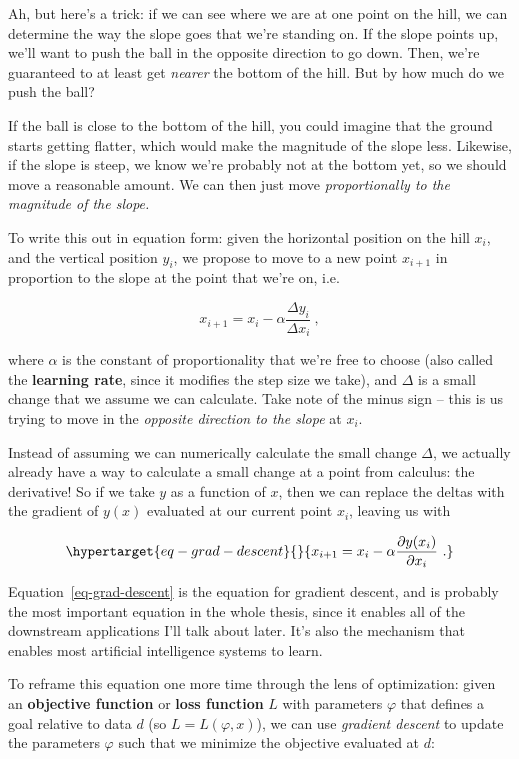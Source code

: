 \documentclass[
  11pt,
  numbers=noendperiod]{book}
\begin{document}
Ah, but here's a trick: if we can see where we are at one point on the
hill, we can determine the way the slope goes that we're standing on. If
the slope points up, we'll want to push the ball in the opposite
direction to go down. Then, we're guaranteed to at least get
\emph{nearer} the bottom of the hill. But by how much do we push the
ball?

If the ball is close to the bottom of the hill, you could imagine that
the ground starts getting flatter, which would make the magnitude of the
slope less. Likewise, if the slope is steep, we know we're probably not
at the bottom yet, so we should move a reasonable amount. We can then
just move \emph{proportionally to the magnitude of the slope.}

To write this out in equation form: given the horizontal position on the
hill \(x_i\), and the vertical position \(y_i\), we propose to move to a
new point \(x_{i+1}\) in proportion to the slope at the point that we're
on, i.e.

\[
x_{i+1} = x_i - \alpha \frac{\Delta y_i}{\Delta x_i}~,
\]

where \(\alpha\) is the constant of proportionality that we're free to
choose (also called the \textbf{learning rate}, since it modifies the
step size we take), and \(\Delta\) is a small change that we assume we
can calculate. Take note of the minus sign -- this is us trying to move
in the \emph{opposite direction to the slope} at \(x_i\).

Instead of assuming we can numerically calculate the small change
\(\Delta\), we actually already have a way to calculate a small change
at a point from calculus: the derivative! So if we take \(y\) as a
function of \(x\), then we can replace the deltas with the gradient of
\(y(x)\) evaluated at our current point \(x_i\), leaving us with

\begin{equation}\protect\hypertarget{eq-grad-descent}{}{
x_{i+1} = x_i - \alpha \frac{\partial y(x_i)}{\partial x_i}~.
}\label{eq-grad-descent}\end{equation}

Equation~\ref{eq-grad-descent} is the equation for gradient descent, and
is probably the most important equation in the whole thesis, since it
enables all of the downstream applications I'll talk about later. It's
also the mechanism that enables most artificial intelligence systems to
learn.

To reframe this equation one more time through the lens of optimization:
given an \textbf{objective function} or \textbf{loss function} \(L\)
with parameters \(\varphi\) that defines a goal relative to data \(d\)
(so \(L=L(\varphi, x)\)), we can use \emph{gradient descent} to update
the parameters \(\varphi\) such that we minimize the objective evaluated
at \(d\):
\end{document}
